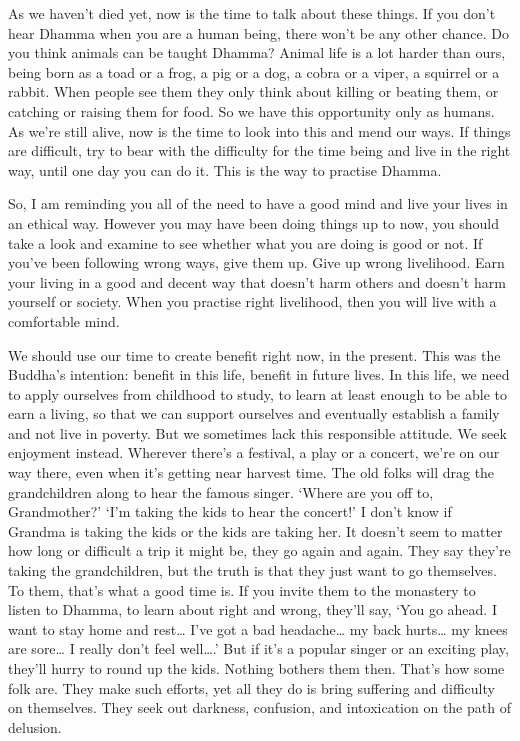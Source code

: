 As we haven't died yet, now is the time to talk about these things. If
you don't hear Dhamma when you are a human being, there won't be any
other chance. Do you think animals can be taught Dhamma? Animal life is
a lot harder than ours, being born as a toad or a frog, a pig or a dog, 
a cobra or a viper, a squirrel or a rabbit. When people see them they
only think about killing or beating them, or catching or raising them
for food. So we have this opportunity only as humans. As we're still
alive, now is the time to look into this and mend our ways. If things
are difficult, try to bear with the difficulty for the time being and
live in the right way, until one day you can do it. This is the way to
practise Dhamma. 

So, I am reminding you all of the need to have a good mind and live your
lives in an ethical way. However you may have been doing things up to
now, you should take a look and examine to see whether what you are
doing is good or not. If you've been following wrong ways, give them up. 
Give up wrong livelihood. Earn your living in a good and decent way that
doesn't harm others and doesn't harm yourself or society. When you
practise right livelihood, then you will live with a comfortable mind. 

We should use our time to create benefit right now, in the present. This
was the Buddha's intention: benefit in this life, benefit in future
lives. In this life, we need to apply ourselves from childhood to study, 
to learn at least enough to be able to earn a living, so that we can
support ourselves and eventually establish a family and not live in
poverty. But we sometimes lack this responsible attitude. We seek
enjoyment instead. Wherever there's a festival, a play or a concert, 
we're on our way there, even when it's getting near harvest time. The
old folks will drag the grandchildren along to hear the famous singer. 
`Where are you off to, Grandmother?' `I'm taking the kids to hear the
concert!' I don't know if Grandma is taking the kids or the kids are
taking her. It doesn't seem to matter how long or difficult a trip it
might be, they go again and again. They say they're taking the
grandchildren, but the truth is that they just want to go themselves. To
them, that's what a good time is. If you invite them to the monastery to
listen to Dhamma, to learn about right and wrong, they'll say, `You go
ahead. I want to stay home and rest\ldots{} I've got a bad
headache\ldots{} my back hurts\ldots{} my knees are sore\ldots{} I
really don't feel well\ldots{}.' But if it's a popular singer or an
exciting play, they'll hurry to round up the kids. Nothing bothers them
then. That's how some folk are. They make such efforts, yet all they do
is bring suffering and difficulty on themselves. They seek out darkness, 
confusion, and intoxication on the path of delusion. 

